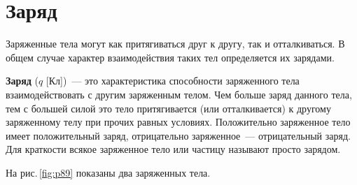 \documentclass[main.tex]{subfiles}
\begin{document}

\pagestyle{empty}

 

\setcounter{section}{2
}
\addtocounter{section}{-1} 

\section{Заряд}


Заряженные тела могут как притягиваться друг к другу, так и отталкиваться. В общем случае характер взаимодействия таких тел определяется их зарядами.

\textbf{Заряд} ($q$ [Кл])~--- это характеристика способности заряженного тела взаимодействовать с другим заряженным телом. Чем больше заряд данного тела, тем с большей силой это тело притягивается (или отталкивается) к другому заряженному телу при прочих равных условиях. Положительно заряженное тело имеет положительный заряд, отрицательно заряженное~--- отрицательный заряд. Для краткости всякое заряженное тело или частицу называют просто зарядом.

На рис.\,\ref{fig:p89} показаны два заряженных тела.
\end{document}
